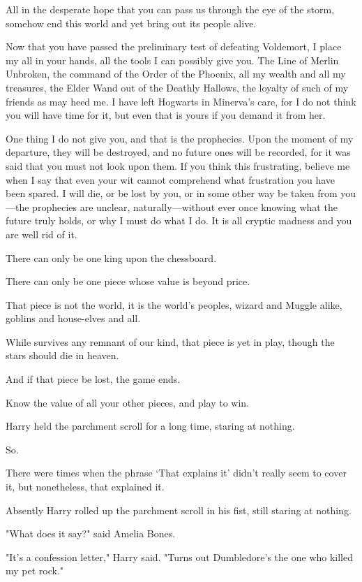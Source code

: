 \begin{writtenNote}
All in the desperate hope that you can pass us through the eye of the
storm, somehow end this world and yet bring out its people alive.

Now that you have passed the preliminary test of defeating Voldemort, I
place my all in your hands, all the tools I can possibly give you. The Line of
Merlin Unbroken, the command of the Order of the Phoenix, all my wealth and all
my treasures, the Elder Wand out of the Deathly Hallows, the loyalty of such of
my friends as may heed me. I have left Hogwarts in Minerva's care, for I do not
think you will have time for it, but even that is yours if you demand it from
her.

One thing I do not give you, and that is the prophecies. Upon the moment
of my departure, they will be destroyed, and no future ones will be recorded,
for it was said that you must not look upon them. If you think this
frustrating, believe me when I say that even your wit cannot comprehend what
frustration you have been spared. I will die, or be lost by you, or in some
other way be taken from you---the prophecies are unclear, naturally---without
ever once knowing what the future truly holds, or why I must do what I do. It
is all cryptic madness and you are well rid of it.

There can only be one king upon the chessboard.

There can only be one piece whose value is beyond price.

That piece is not the world, it is the world's peoples, wizard and Muggle
alike, goblins and house-elves and all.

While survives any remnant of our kind, that piece is yet in play, though
the stars should die in heaven.

And if that piece be lost, the game ends.

Know the value of all your other pieces, and play to win.

\end{writtenNote}
\sbreak
Harry held the parchment scroll for a long time, staring at nothing.

So.

There were times when the phrase `That explains it' didn't really seem to cover
it, but nonetheless, that explained it.

Absently Harry rolled up the parchment scroll in his fist, still staring at
nothing.

"What does it say?" said Amelia Bones.

"It's a confession letter," Harry said. "Turns out Dumbledore's the one who
killed my pet rock."

